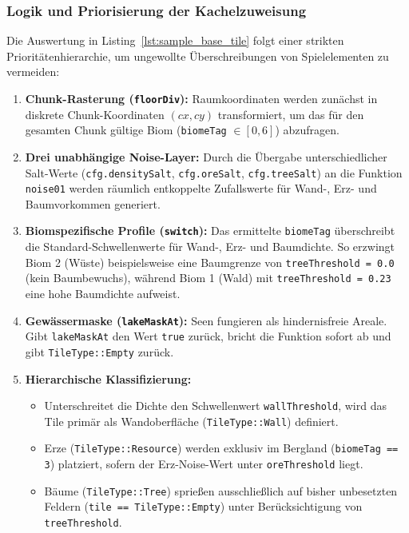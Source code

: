 \documentclass[
  a4paper,
  11pt,
  twoside,
  BCOR=8mm,           %
  headings=big,
  numbers=noenddot,
  listof=totoc,       %
  captions=tableheading,
]{scrreprt}
\begin{document}
\subsubsection{Logik und Priorisierung der Kachelzuweisung}
Die Auswertung in Listing~\ref{lst:sample_base_tile} folgt einer strikten Prioritätenhierarchie, um ungewollte Überschreibungen von Spielelementen zu vermeiden:

\begin{enumerate}
    \item \textbf{Chunk-Rasterung (\texttt{floorDiv}):} Raumkoordinaten werden zunächst in diskrete Chunk-Koordinaten $(cx, cy)$ transformiert, um das für den gesamten Chunk gültige Biom (\texttt{biomeTag} $\in [0, 6]$) abzufragen.
    \item \textbf{Drei unabhängige Noise-Layer:} Durch die Übergabe unterschiedlicher Salt-Werte (\texttt{cfg.densitySalt}, \texttt{cfg.oreSalt}, \texttt{cfg.treeSalt}) an die Funktion \texttt{noise01} werden räumlich entkoppelte Zufallswerte für Wand-, Erz- und Baumvorkommen generiert.
    \item \textbf{Biomspezifische Profile (\texttt{switch}):} Das ermittelte \texttt{biomeTag} überschreibt die Standard-Schwellenwerte für Wand-, Erz- und Baumdichte. So erzwingt Biom 2 (Wüste) beispielsweise eine Baumgrenze von \texttt{treeThreshold = 0.0} (kein Baumbewuchs), während Biom 1 (Wald) mit \texttt{treeThreshold = 0.23} eine hohe Baumdichte aufweist.
    \item \textbf{Gewässermaske (\texttt{lakeMaskAt}):} Seen fungieren als hindernisfreie Areale. Gibt \texttt{lakeMaskAt} den Wert \texttt{true} zurück, bricht die Funktion sofort ab und gibt \texttt{TileType::Empty} zurück.
    \item \textbf{Hierarchische Klassifizierung:}
    \begin{itemize}
        \item Unterschreitet die Dichte den Schwellenwert \texttt{wallThreshold}, wird das Tile primär als Wandoberfläche (\texttt{TileType::Wall}) definiert.
        \item Erze (\texttt{TileType::Resource}) werden exklusiv im Bergland (\texttt{biomeTag == 3}) platziert, sofern der Erz-Noise-Wert unter \texttt{oreThreshold} liegt.
        \item Bäume (\texttt{TileType::Tree}) sprießen ausschließlich auf bisher unbesetzten Feldern (\texttt{tile == TileType::Empty}) unter Berücksichtigung von \texttt{treeThreshold}.
    \end{itemize}
\end{enumerate}
\end{document}
